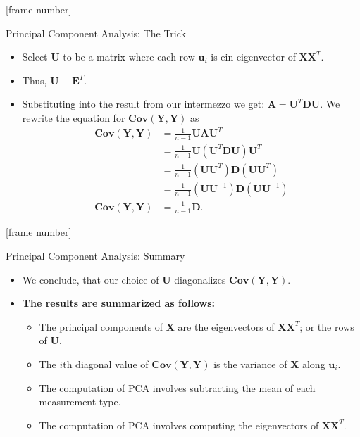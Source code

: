 \documentclass[aspectratio=169,t]{beamer}
\begin{document}
  {
    [frame number]
    \begin{frame}{Principal Component Analysis: The Trick}
    \begin{itemize}
      \item Select $\mathbf{U}$ to be a matrix where each row $\mathbf{u}_i$ is ein eigenvector of $\mathbf{XX}^T$.
      \item Thus, $\mathbf{U} \equiv \mathbf{E}^T$.
      \item Substituting into the result from our intermezzo we get: $\mathbf{A} = \mathbf{U}^T\mathbf{DU}$. We rewrite the equation for $\mathbf{Cov}(\mathbf{Y},\mathbf{Y})$ as
      \begin{align}
        \mathbf{Cov}(\mathbf{Y},\mathbf{Y}) &= \frac{1}{n-1} \mathbf{UAU}^T \\
        &= \frac{1}{n-1} \mathbf{U}(\mathbf{U}^T\mathbf{DU})\mathbf{U}^T \\
        &= \frac{1}{n-1} (\mathbf{UU}^T)\mathbf{D}(\mathbf{UU}^T) \\
        &= \frac{1}{n-1} (\mathbf{UU}^{-1})\mathbf{D}(\mathbf{UU}^{-1}) \\
        \mathbf{Cov}(\mathbf{Y},\mathbf{Y}) &= \frac{1}{n-1} \mathbf{D}.
      \end{align}
    \end{itemize}
    \end{frame}
  }

  {
    [frame number]
    \begin{frame}{Principal Component Analysis: Summary}
    \begin{itemize}
      \item We conclude, that our choice of $\mathbf{U}$ diagonalizes $\mathbf{Cov}(\mathbf{Y},\mathbf{Y})$.
      \item \textbf{The results are summarized as follows:}
      \begin{itemize}
        \item The principal components of $\mathbf{X}$ are the eigenvectors of $\mathbf{XX}^T$; or the rows of $\mathbf{U}$.
        \item The $i$th diagonal value of $\mathbf{Cov}(\mathbf{Y},\mathbf{Y})$ is the variance of $\mathbf{X}$ along $\mathbf{u}_i$.
        \item The computation of PCA involves subtracting the mean of each measurement type.
        \item The computation of PCA involves computing the eigenvectors of $\mathbf{XX}^T$.
      \end{itemize}
    \end{itemize}
    \end{frame}
  }
\end{document}
